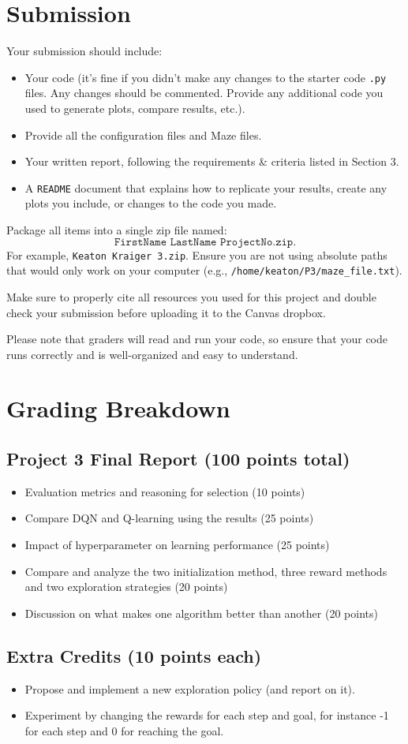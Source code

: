 \documentclass[12pt]{article}
\begin{document}
\section{Submission}
Your submission should include:
\begin{itemize}
  \item Your code (it's fine if you didn't make any changes to the starter code \texttt{.py} files. Any changes should be commented. Provide any additional code you used to generate plots, compare results, etc.).
  \item Provide all the configuration files and Maze files.
  \item Your written report, following the requirements \& criteria listed in Section 3.
  \item A \texttt{README} document that explains how to replicate your results, create any plots you include, or changes to the code you made.
\end{itemize}

Package all items into a single zip file named:
\[
\texttt{FirstName LastName ProjectNo.zip}.
\]
For example, \texttt{Keaton Kraiger 3.zip}. Ensure you are not using absolute paths that would only work on your computer (e.g., \texttt{/home/keaton/P3/maze\_file.txt}).  


Make sure to properly cite all resources you used for this project and double check your submission before uploading it to the Canvas dropbox.  


Please note that graders will read and run your code, so ensure that your code runs correctly and is well-organized and easy to understand.  

\section{Grading Breakdown}
\subsection*{Project 3 Final Report (100 points total)}
\begin{itemize}
  \item Evaluation metrics and reasoning for selection (10 points)
  \item Compare DQN and Q-learning using the results (25 points)
  \item Impact of hyperparameter on learning performance (25 points)
  \item Compare and analyze the two initialization method, three reward methods and two exploration strategies (20 points)
  \item Discussion on what makes one algorithm better than another (20 points)
\end{itemize}

\subsection*{Extra Credits (10 points each)}
\begin{itemize}
  \item Propose and implement a new exploration policy (and report on it).
  \item Experiment by changing the rewards for each step and goal, for instance -1
for each step and 0 for reaching the goal.
\end{itemize}
\end{document}

